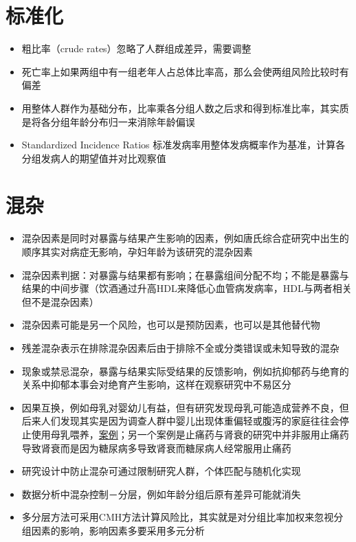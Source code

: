 \documentclass[
]{book}
\providecommand{\tightlist}{%
  \setlength{\itemsep}{0pt}\setlength{\parskip}{0pt}}
\begin{document}
\hypertarget{ux6807ux51c6ux5316}{%
\section{标准化}\label{ux6807ux51c6ux5316}}

\begin{itemize}
\tightlist
\item
  粗比率（crude rates）忽略了人群组成差异，需要调整
\item
  死亡率上如果两组中有一组老年人占总体比率高，那么会使两组风险比较时有偏差
\item
  用整体人群作为基础分布，比率乘各分组人数之后求和得到标准比率，其实质是将各分组年龄分布归一来消除年龄偏误
\item
  Standardized Incidence Ratios 标准发病率用整体发病概率作为基准，计算各分组发病人的期望值并对比观察值
\end{itemize}

\hypertarget{ux6df7ux6742}{%
\section{混杂}\label{ux6df7ux6742}}

\begin{itemize}
\tightlist
\item
  混杂因素是同时对暴露与结果产生影响的因素，例如唐氏综合症研究中出生的顺序其实对病症无影响，孕妇年龄为该研究的混杂因素
\item
  混杂因素判据：对暴露与结果都有影响；在暴露组间分配不均；不能是暴露与结果的中间步骤（饮酒通过升高HDL来降低心血管病发病率，HDL与两者相关但不是混杂因素）
\item
  混杂因素可能是另一个风险，也可以是预防因素，也可以是其他替代物
\item
  残差混杂表示在排除混杂因素后由于排除不全或分类错误或未知导致的混杂
\item
  现象或禁忌混杂，暴露与结果实际受结果的反馈影响，例如抗抑郁药与绝育的关系中抑郁本事会对绝育产生影响，这样在观察研究中不易区分
\item
  因果互换，例如母乳对婴幼儿有益，但有研究发现母乳可能造成营养不良，但后来人们发现其实是因为调查人群中婴儿出现体重偏轻或腹泻的家庭往往会停止使用母乳喂养，\href{http://ije.oxfordjournals.org/content/26/2/349.full.pdf+html}{案例}；另一个案例是止痛药与肾衰的研究中并非服用止痛药导致肾衰而是因为糖尿病多导致肾衰而糖尿病人经常服用止痛药
\item
  研究设计中防止混杂可通过限制研究人群，个体匹配与随机化实现
\item
  数据分析中混杂控制－分层，例如年龄分组后原有差异可能就消失
\item
  多分层方法可采用CMH方法计算风险比，其实就是对分组比率加权来忽视分组因素的影响，影响因素多要采用多元分析
\end{itemize}
\end{document}
